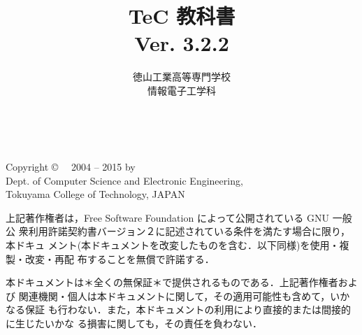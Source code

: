 \documentclass[a4j,twocolumn,twoside,dvipdfmx]{jbook}
\begin{document}
\setlength{\textheight}{23cm}
\setlength{\topmargin}{0pt}
\setlength{\headsep}{1cm}
\setlength{\columnsep}{1.5cm}

\title{TeC 教科書\\Ver. 3.2.2}
\author{徳山工業高等専門学校\\情報電子工学科}
\date{}

\maketitle

\thispagestyle{empty}
\onecolumn
~
\vfill
\begin{flushleft}
Copyright \copyright ~~ 2004 -- 2015 by \\
Dept. of Computer Science and Electronic Engineering, \\
Tokuyama College of Technology, JAPAN
\end{flushleft}

\vspace{0.8cm}
上記著作権者は，Free Software Foundation によって公開されている GNU 一般公
衆利用許諾契約書バージョン２に記述されている条件を満たす場合に限り，本ドキュ
メント(本ドキュメントを改変したものを含む．以下同様)を使用・複製・改変・再配
布することを無償で許諾する．

本ドキュメントは＊全くの無保証＊で提供されるものである．上記著作権者および
関連機関・個人は本ドキュメントに関して，その適用可能性も含めて，いかなる保証
も行わない．また，本ドキュメントの利用により直接的または間接的に生じたいかな
る損害に関しても，その責任を負わない．
\setcounter{page}{0}

\newpage
{}
\tableofcontents

\onecolumn
~
\thispagestyle{empty}
\setcounter{page}{0}

\newpage
\twocolumn
{}

\end{document}
